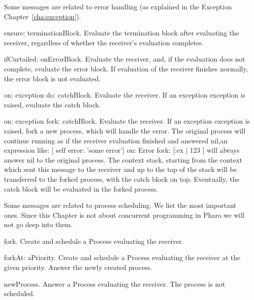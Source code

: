 \documentclass[a4paper,10pt,twoside]{book}
\begin{document}
Some messages are related to error handling (as explained in the Exception Chapter~\ref{cha:exception}).

\begin{description}
\item{\textsf{ensure: terminationBlock}}. Evaluate the termination block after evaluating the receiver, regardless of whether the receiver's evaluation completes.
\item{\textsf{ifCurtailed: onErrorBlock}}. Evaluate the receiver, and, if the evaluation does not complete, evaluate the error block. If evaluation of the receiver finishes normally, the error block is not evaluated.

\item{\textsf{on: exception do: catchBlock}}. Evaluate the receiver. If an exception \textsf{exception} is raised, evaluate the catch block.

\item{\textsf{on: exception fork: catchBlock}}. Evaluate the receiver. If an exception \textsf{exception} is raised, fork a new process, which will handle the error. The original process will continue running as if the receiver evaluation finished and answered nil,\ie  an expression like: \textsf{[ self error: 'some error'] on: Error fork: [:ex |  123 ]} will always answer nil to the original process. The context stack, starting from the context which sent this message to the receiver and up to the top of the stack will be transferred to the forked process, with the catch block on top. Eventually, the catch block will be evaluated in the forked process.
\end{description}


Some messages are related to process scheduling. We list the most important ones. Since this Chapter is not about concurrent programming in Pharo we will not go deep into them.

\begin{description}
\item{\textsf{fork}}. Create and schedule a Process evaluating the receiver.

\item{\textsf{forkAt: aPriority}}. Create and schedule a Process evaluating the receiver at the given priority. Answer the newly created process.

\item{\textsf{newProcess}}. Answer a Process evaluating the receiver. The process is not scheduled.
\end{description}
\end{document}
